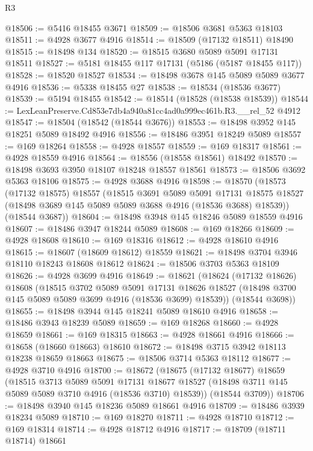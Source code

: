 \begin{lexlean}{R3}
\begin{coremodule}
@18506 := @5416 @18455 @3671
@18509 := @18506 @3681 @5363 @18103
@18511 := @4928 @3677 @4916
@18514 := @18509 (@17132 @18511) @18490
@18515 := @18498 @134
@18520 := @18515 @3680 @5089 @5091 @17131 @18511
@18527 := @5181 @18455 @117 @17131 (@5186 (@5187 @18455 @117))
@18528 := @18520 @18527
@18534 := @18498 @3678 @145 @5089 @5089 @3677 @4916
@18536 := @5338 @18455 @27
@18538 := @18534 (@18536 @3677)
@18539 := @5194 @18455
@18542 := @18514 (@18528 (@18538 @18539))
@18544 := LexLeanPreserve.Cd853e7db4a940a81cc4ad0a999ec461b.R3.__rel_52 @4912
@18547 := @18504 (@18542 (@18544 @3676))
@18553 := @18498 @3952 @145 @18251 @5089 @18492 @4916
@18556 := @18486 @3951 @18249 @5089
@18557 := @169 @18264
@18558 := @4928 @18557
@18559 := @169 @18317
@18561 := @4928 @18559 @4916
@18564 := @18556 (@18558 @18561) @18492
@18570 := @18498 @3693 @3950 @18107 @18248 @18557 @18561
@18573 := @18506 @3692 @5363 @18106
@18575 := @4928 @3688 @4916
@18598 := @18570
    (@18573
      (@17132 @18575)
      @18557
      (@18515
        @3691
        @5089
        @5091
        @17131
        @18575
        @18527
        (@18498 @3689 @145 @5089 @5089 @3688 @4916 (@18536 @3688) @18539))
      (@18544 @3687))
@18604 := @18498 @3948 @145 @18246 @5089 @18559 @4916
@18607 := @18486 @3947 @18244 @5089
@18608 := @169 @18266
@18609 := @4928 @18608
@18610 := @169 @18316
@18612 := @4928 @18610 @4916
@18615 := @18607 (@18609 @18612) @18559
@18621 := @18498 @3704 @3946 @18110 @18243 @18608 @18612
@18624 := @18506 @3703 @5363 @18109
@18626 := @4928 @3699 @4916
@18649 := @18621
    (@18624
      (@17132 @18626)
      @18608
      (@18515
        @3702
        @5089
        @5091
        @17131
        @18626
        @18527
        (@18498 @3700 @145 @5089 @5089 @3699 @4916 (@18536 @3699) @18539))
      (@18544 @3698))
@18655 := @18498 @3944 @145 @18241 @5089 @18610 @4916
@18658 := @18486 @3943 @18239 @5089
@18659 := @169 @18268
@18660 := @4928 @18659
@18661 := @169 @18315
@18663 := @4928 @18661 @4916
@18666 := @18658 (@18660 @18663) @18610
@18672 := @18498 @3715 @3942 @18113 @18238 @18659 @18663
@18675 := @18506 @3714 @5363 @18112
@18677 := @4928 @3710 @4916
@18700 := @18672
    (@18675
      (@17132 @18677)
      @18659
      (@18515
        @3713
        @5089
        @5091
        @17131
        @18677
        @18527
        (@18498 @3711 @145 @5089 @5089 @3710 @4916 (@18536 @3710) @18539))
      (@18544 @3709))
@18706 := @18498 @3940 @145 @18236 @5089 @18661 @4916
@18709 := @18486 @3939 @18234 @5089
@18710 := @169 @18270
@18711 := @4928 @18710
@18712 := @169 @18314
@18714 := @4928 @18712 @4916
@18717 := @18709 (@18711 @18714) @18661

\end{coremodule}
\end{lexlean}
